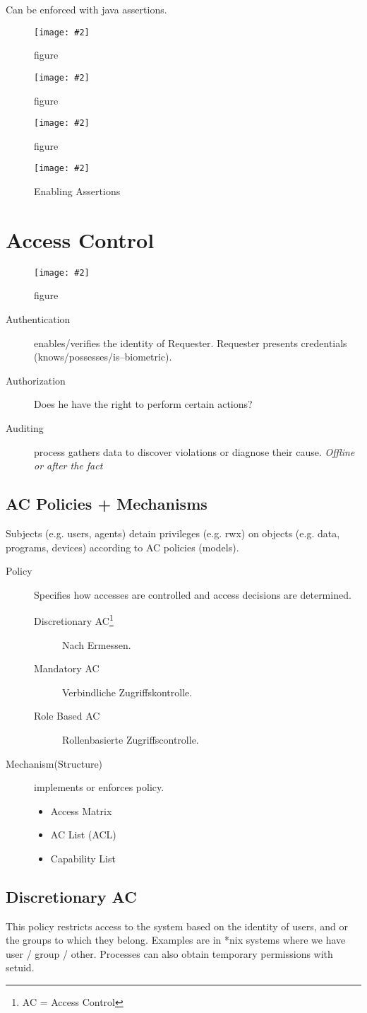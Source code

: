 \documentclass[a4paper,10pt]{scrreprt}
\newcommand{\pic}[2][figure]{\begin{figure}[h]
 \centering
 \texttt{[image: \#2]}
 \caption{#1}
\end{figure}
}
\begin{document}
Can be enforced with java assertions.
\pic{aex1.png}
\pic{aex2.png}
\pic{aex3.png}

\pic[Enabling Assertions]{aex4.png}

\chapter{Access Control}
\pic{acc.png}

\begin{description}
 \item [Authentication] enables/verifies the identity of Requester. Requester presents credentials 
(knows/possesses/is--biometric). 
\item [Authorization] Does he have the right to perform certain actions?
\item [Auditing] process gathers data to discover violations or diagnose their cause. \textit{Offline or after the fact}
\end{description}

\section{AC Policies + Mechanisms}
Subjects (e.g. users, agents) detain privileges (e.g. rwx) on objects (e.g. data, programs, devices) according to AC 
policies (models).
\begin{description}
 \item [Policy] Specifies how accesses are controlled and access decisions are determined. 
 \begin{description}
  \item [Discretionary AC\footnote{AC = Access Control}] Nach Ermessen.
  \item [Mandatory AC] Verbindliche Zugriffskontrolle. 
  \item [Role Based AC] Rollenbasierte Zugriffscontrolle. 
  
 \end{description}
\item [Mechanism(Structure)] implements or enforces policy. 
\begin{itemize}
 \item Access Matrix
 \item AC List (ACL)
 \item Capability List
\end{itemize}
\end{description}

\section{Discretionary AC}
This policy restricts access to the system based on the identity of users, and or the groups to which they belong.
Examples are in *nix systems where we have user / group / other. Processes can also obtain temporary permissions with 
setuid.
\end{document}
